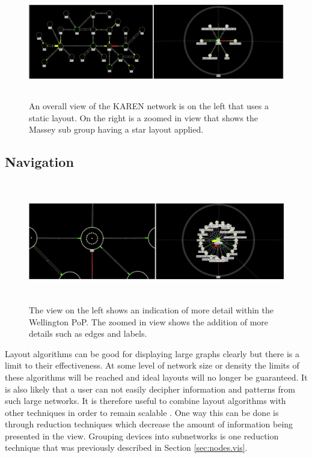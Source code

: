 \documentclass[11pt, a4paper]{article}
\begin{document}
\begin{figure}
\centering
\includegraphics[width=170mm,height=49.34mm]{assets/layouts1-1.eps}
\caption{An overall view of the KAREN network is on the left that uses a static
layout. On the right is a zoomed in view that shows the Massey sub group having 
a star layout applied.}
\label{fig:layouts1.1}
\end{figure}


\subsection{Navigation}
\label{sec:navigation.vis}

\begin{figure}[h]
\centering
\includegraphics[width=170mm,height=53mm]{assets/nav1-0.eps}
\caption{The view on the left shows an indication of more detail within the
Wellington PoP. The zoomed in view shows the addition of more details such 
as edges and labels.}
\label{fig:nav1.0}
\end{figure}

Layout algorithms can be good for displaying large graphs clearly but there is a
limit to their effectiveness. At some level of network size or density the
limits of these algorithms will be reached and ideal layouts will no longer be
guaranteed. It is also likely that a user can not easily decipher information
and patterns from such large networks. It is therefore useful to combine layout
algorithms with other techniques in order to remain scalable \cite{Herman_2000}.
One way this can be done is through reduction techniques which decrease the
amount of information being presented in the view. Grouping devices into
subnetworks is one reduction technique that was previously described in Section
\ref{sec:nodes.vis}. 
\end{document}
